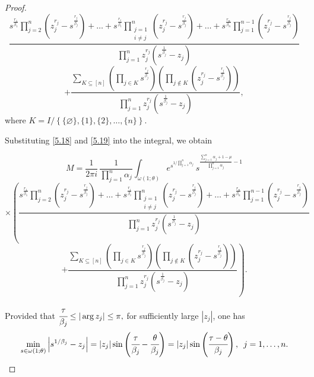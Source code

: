 \documentclass[12pt, reqno]{amsart}
\theoremstyle{definition}
\theoremstyle{remark}
\numberwithin{equation}{section}
\begin{document}
\begin{proof}
\begin{equation}
    \frac{s^{\frac{r_1}{\beta_1}}\prod\limits_{j=2}^n\left(z_j^{r_j}-s^{\frac{r_j}{\beta_j}}\right)+\dots+s^{\frac{r_i}{\beta_i}}\prod\limits_{\substack{j=1\\i\neq j}}^{n}\left(z_j^{r_j}-s^{\frac{r_j}{\beta_j}}\right)+\dots+s^{\frac{r_n}{\beta_n}}\prod\limits_{j=1}^{n-1}\left(z_j^{r_j}-s^{\frac{r_j}{\beta_j}}\right)}{\prod\limits_{j=1}^nz_j^{r_j}\left(s^{\frac{1}{\beta_j}}-z_j\right)}\end{equation}
\begin{equation}\label{5.19}
    +\frac{\sum\limits_{K\subseteq[n]}
\left(
\prod\limits_{j\in K}s^{\frac{r_j}{\beta_j}}
\right)
\left(
\prod\limits_{j\notin K}\left(z_j^{r_j}-s^{\frac{r_j}{\beta_j}}\right)
\right)}{\prod\limits_{j=1}^nz_j^{r_j}\left(s^{\frac{1}{\beta_j}}-z_j\right)},\end{equation}
where $K=I/\left\{\{\varnothing\},\{1\},\{2\},\dots,\{n\}\right\}$. 

Substituting \eqref{5.18} and \eqref{5.19} into the integral, we obtain

\begin{equation}\label{5.20}M=\frac{1}{2\pi i}\,
\frac{1}{\prod\limits_{{j=1}}^n\alpha_j}\int_{\omega(1;\theta)}
e^{s^{1/\prod\limits_{{j=1}}^n\alpha_j}}
\,s^{\frac{\sum\limits_{j=1}^n\alpha_j+1-\mu}{\prod\limits_{j=1}^n\alpha_j}-1}\end{equation}
$$\times
\left(\frac{s^{\frac{r_1}{\beta_1}}\prod\limits_{j=2}^n\left(z_j^{r_j}-s^{\frac{r_j}{\beta_j}}\right)+\dots+s^{\frac{r_i}{\beta_i}}\prod\limits_{\substack{j=1\\i\neq j}}^{n}\left(z_j^{r_j}-s^{\frac{r_j}{\beta_j}}\right)+\dots+s^{\frac{r_n}{\beta_n}}\prod\limits_{j=1}^{n-1}\left(z_j^{r_j}-s^{\frac{r_j}{\beta_j}}\right)}{\prod\limits_{j=1}^nz_j^{r_j}\left(s^{\frac{1}{\beta_j}}-z_j\right)}\right.$$
$$\left.+\frac{\sum\limits_{K\subseteq[n]}
\left(
\prod\limits_{j\in K}s^{\frac{r_j}{\beta_j}}
\right)
\left(
\prod\limits_{j\notin K}\left(z_j^{r_j}-s^{\frac{r_j}{\beta_j}}\right)
\right)}{\prod\limits_{j=1}^nz_j^{r_j}\left(s^{\frac{1}{\beta_j}}-z_j\right)}\right).$$

Provided that
$
\cfrac{\tau}{\beta_j}\leq|\arg z_j|\le\pi,
$
for sufficiently large $|z_j|$, one has
\begin{equation}\label{5.21}
\min_{s\in\omega(1;\theta)}
\left|s^{1/\beta_j}-z_j\right|
= |z_j|
\sin\left(\cfrac{\tau}{\beta_j}-\cfrac{\theta}{\beta_j}\right)=|z_j|\sin\left(\cfrac{\tau-\theta}{\beta_j}\right),\,\,\, j=1,\dots,n.
\end{equation}


\end{proof}
\end{document}
